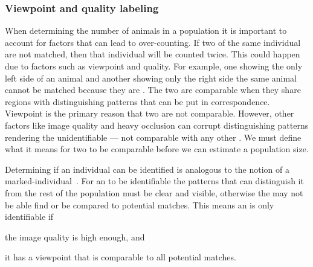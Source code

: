         \subsubsection{Viewpoint and quality labeling}\label{sub:viewqual}
            When determining the number of animals in a population it is important to account for factors that can lead
            to over-counting. If two \annots{} of the same individual are not matched, then that individual will be
            counted twice. This could happen due to factors such as viewpoint and quality. For example, one \annot{}
            showing the only left side of an animal and another \annot{} showing only the right side the same animal
            cannot be matched because they are . The two \annots{} are comparable when they
            share regions with distinguishing patterns that can be put in correspondence. Viewpoint is the primary
            reason that two \annots{} are not comparable. However, other factors like image quality and heavy occlusion
            can corrupt distinguishing patterns rendering the \annot{} unidentifiable --- not comparable with any other
            \annot{}. We must define what it means for two \annots{} to be comparable before we can estimate a
            population size.

            Determining if an individual can be identified is analogous to the
            notion of a marked-individual~\cite{seber_estimation_1982}. For an
            \annot{} to be identifiable the patterns that can distinguish it
            from the rest of the population must be clear and visible, otherwise
            the \annot{} may not be able find or be compared to potential
            matches. This means an \annot{} is only identifiable if
            \begin{enumin}
                \item the image quality is high enough, and %
                \item it has a viewpoint that is comparable to all potential
                matches. %
            \end{enumin}
            
